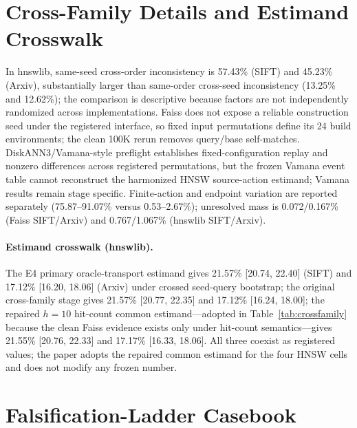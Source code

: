 \documentclass{article}
\begin{document}
\section{Cross-Family Details and Estimand Crosswalk}
\label{app:crossfamily}

In hnswlib, same-seed cross-order inconsistency is 57.43\% (SIFT) and 45.23\% (Arxiv), substantially larger
than same-order cross-seed inconsistency (13.25\% and 12.62\%); the comparison is descriptive because
factors are not independently randomized across implementations. Faiss does not expose a reliable
construction seed under the registered interface, so fixed input permutations define its 24 build
environments; the clean 100K rerun removes query/base self-matches. DiskANN3/Vamana-style preflight
establishes fixed-configuration replay and nonzero differences across registered permutations, but the
frozen Vamana event table cannot reconstruct the harmonized HNSW source-action estimand; Vamana results
remain stage specific. Finite-action and endpoint variation are reported separately (75.87--91.07\% versus
0.53--2.67\%); unresolved mass is 0.072/0.167\% (Faiss SIFT/Arxiv) and 0.767/1.067\% (hnswlib SIFT/Arxiv).

\paragraph{Estimand crosswalk (hnswlib).}
The E4 primary oracle-transport estimand gives 21.57\% [20.74, 22.40] (SIFT) and 17.12\% [16.20, 18.06]
(Arxiv) under crossed seed-query bootstrap; the original cross-family stage gives 21.57\% [20.77, 22.35]
and 17.12\% [16.24, 18.00]; the repaired $h{=}10$ hit-count common estimand---adopted in
Table~\ref{tab:crossfamily} because the clean Faiss evidence exists only under hit-count semantics---gives
21.55\% [20.76, 22.33] and 17.17\% [16.33, 18.06]. All three coexist as registered values; the paper adopts
the repaired common estimand for the four HNSW cells and does not modify any frozen number.

\section{Falsification-Ladder Casebook}
\label{app:ladder}
\end{document}

